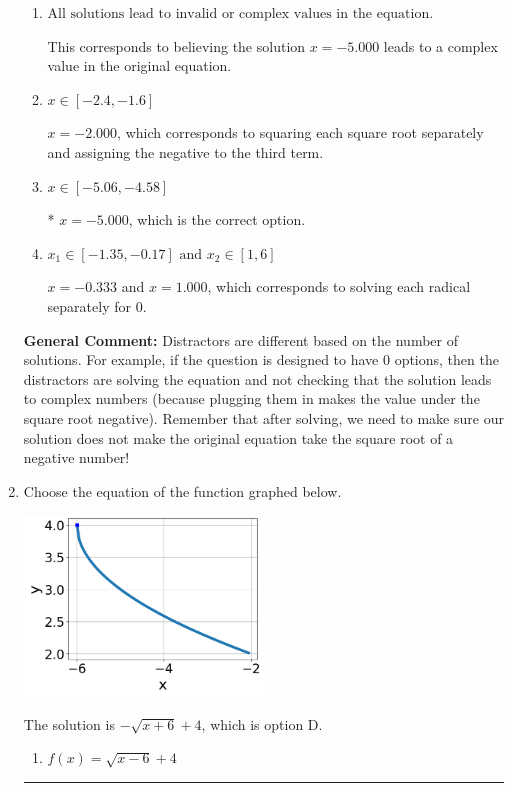 \documentclass{extbook}[14pt]
\newcommand{\litem}[1]{\item #1

\rule{\textwidth}{0.4pt}}
\begin{document}
\begin{enumerate}
{\begin{enumerate}[label=\Alph*.]
$x = -5.000$ and $x = 1.000$, which corresponds to solving the equation correctly and including the value that makes the first square root 0.
\item \( \text{All solutions lead to invalid or complex values in the equation.} \)

This corresponds to believing the solution $x = -5.000$ leads to a complex value in the original equation.
\item \( x \in [-2.4,-1.6] \)

$x = -2.000$, which corresponds to squaring each square root separately and assigning the negative to the third term.
\item \( x \in [-5.06,-4.58] \)

* $x = -5.000$, which is the correct option.
\item \( x_1 \in [-1.35, -0.17] \text{ and } x_2 \in [1,6] \)

$x = -0.333$ and $x = 1.000$, which corresponds to solving each radical separately for 0.
\end{enumerate}

\textbf{General Comment:} Distractors are different based on the number of solutions. For example, if the question is designed to have 0 options, then the distractors are solving the equation and not checking that the solution leads to complex numbers (because plugging them in makes the value under the square root negative). Remember that after solving, we need to make sure our solution does not make the original equation take the square root of a negative number!
}
\litem{
Choose the equation of the function graphed below.

\begin{center}
    \includegraphics[width=0.5\textwidth]{../Figures/radicalGraphToEquationCopyC.png}
\end{center}



The solution is \( - \sqrt{x + 6} + 4 \), which is option D.\begin{enumerate}[label=\Alph*.]
\item \( f(x) = \sqrt{x - 6} + 4 \)


\end{enumerate}}
\end{enumerate}
\end{document}
